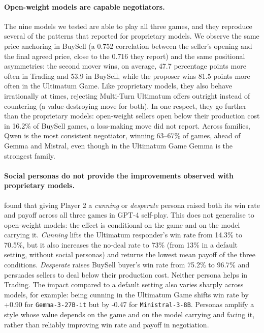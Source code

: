 \paragraph{Open-weight models are capable negotiators.} The nine models we tested are able to play all three games, and they reproduce several of the patterns that \textcite{bianchi_how_2024} reported for proprietary models. We observe the same price anchoring in BuySell (a 0.752 correlation between the seller's opening and the final agreed price, close to the 0.716 they report) and the same positional asymmetries: the second mover wins, on average, 47.7 percentage points more often in Trading and 53.9 in BuySell, while the proposer wins 81.5 points more often in the Ultimatum Game. Like proprietary models, they also behave irrationally at times, rejecting Multi-Turn Ultimatum offers outright instead of countering (a value-destroying move for both). In one respect, they go further than the proprietary models: open-weight sellers open below their production cost in 16.2\% of BuySell games, a loss-making move \textcite{bianchi_how_2024} did not report. Across families, Qwen is the most consistent negotiator, winning 63--67\% of games, ahead of Gemma and Mistral, even though in the Ultimatum Game Gemma is the strongest family.

\paragraph{Social personas do not provide the improvements observed with proprietary models.} \textcite{bianchi_how_2024} found that giving Player 2 a \textit{cunning} or \textit{desperate} persona raised both its win rate and payoff across all three games in GPT-4 self-play. This does not generalise to open-weight models: the effect is conditional on the game and on the model carrying it. \textit{Cunning} lifts the Ultimatum responder's win rate from 14.3\% to 70.5\%, but it also increases the no-deal rate to 73\% (from 13\% in a default setting, without social personas) and returns the lowest mean payoff of the three conditions. \textit{Desperate} raises BuySell buyer's win rate from 75.2\% to 96.7\% and persuades sellers to deal below their production cost. Neither persona helps in Trading. The impact compared to a default setting also varies sharply across models, for example: being cunning in the Ultimatum Game shifts win rate by +0.90 for \texttt{Gemma-3-27B-it} but by -0.47 for \texttt{Ministral-3-8B}. Personas amplify a style whose value depends on the game and on the model carrying and facing it, rather than reliably improving win rate and payoff in negotiation.

